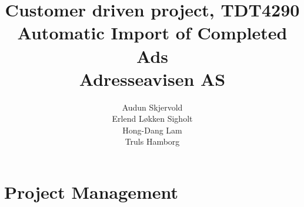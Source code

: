 \documentclass[12pt, a4paper]{article}
\title{\normalsize Customer driven project, TDT4290 \\ \LARGE \textbf{Automatic Import of Completed Ads} \normalsize \\Adresseavisen AS}
\author{Audun Skjervold \\ Erlend Løkken Sigholt \\ Hong-Dang Lam \\ Truls Hamborg}
\begin{document}
\maketitle 
\thispagestyle{empty}
\newpage




\tableofcontents
\newpage

\listoffigures
\newpage

\listoftables
\newpage



\section{Project Management}

























\nocite{methodology}
 
 
 
\appendix


\end{document}
